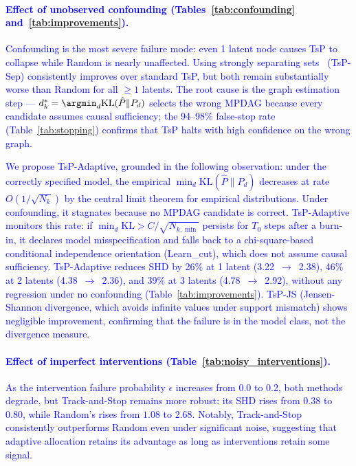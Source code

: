 \documentclass{article}
\newcommand{\added}[1]{\textcolor{blue}{#1}}
\begin{document}
\added{\paragraph{Effect of unobserved confounding (Tables~\ref{tab:confounding} and~\ref{tab:improvements}).}
Confounding is the most severe failure mode: even 1 latent node causes TsP to collapse while Random is nearly unaffected. Using strongly separating sets~\cite{kocaoglu2017experimental} (TsP-Sep) consistently improves over standard TsP, but both remain substantially worse than Random for all $\geq 1$ latents. The root cause is the graph estimation step — $d^*_k = \argmin_d \text{KL}(\hat{P} \| P_d)$ selects the wrong MPDAG because every candidate assumes causal sufficiency; the 94--98\% false-stop rate (Table~\ref{tab:stopping}) confirms that TsP halts with high confidence on the wrong graph.

We propose TsP-Adaptive, grounded in the following observation: under the correctly specified model, the empirical $\min_d \text{KL}(\hat{P} \| P_d)$ decreases at rate $O(1/\sqrt{N_k})$ by the central limit theorem for empirical distributions. Under confounding, it stagnates because no MPDAG candidate is correct. TsP-Adaptive monitors this rate: if $\min_d \text{KL} > C/\sqrt{N_{k,\min}}$ persists for $T_0$ steps after a burn-in, it declares model misspecification and falls back to a chi-square-based conditional independence orientation (Learn\_cut), which does not assume causal sufficiency. TsP-Adaptive reduces SHD by 26\% at 1 latent (3.22~$\to$~2.38), 46\% at 2 latents (4.38~$\to$~2.36), and 39\% at 3 latents (4.78~$\to$~2.92), without any regression under no confounding (Table~\ref{tab:improvements}). TsP-JS (Jensen-Shannon divergence, which avoids infinite values under support mismatch) shows negligible improvement, confirming that the failure is in the model class, not the divergence measure.}

\added{\paragraph{Effect of imperfect interventions (Table~\ref{tab:noisy_interventions}).}
As the intervention failure probability $\epsilon$ increases from 0.0 to 0.2, both methods degrade, but Track-and-Stop remains more robust: its SHD rises from $0.38$ to $0.80$, while Random's rises from $1.08$ to $2.68$. Notably, Track-and-Stop consistently outperforms Random even under significant noise, suggesting that adaptive allocation retains its advantage as long as interventions retain some signal.}
\end{document}
